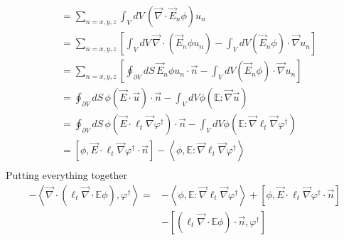 \documentclass[12pt]{report}
\newcommand{\bra}{\left\langle}
\newcommand{\ket}{\right\rangle}
\newcommand{\sbra}{\left[}
\newcommand{\sket}{\right]}
\renewcommand{\div}{\vec{\nabla} \cdot}
\newcommand{\grad}{\vec{\nabla}}
\newcommand{\vefadj}{\varphi^\dag}
\newcommand{\bound}{\partial V}
\newcommand{\vn}{\vec{n}}
\newcommand{\Edd}{\mathbb{E}}
\newcommand{\isigt}{\ell_t}
\begin{document}
\begin{appendices}
\begin{equation}
\begin{split}
& = \sum_{n=x,y,z} \int_V dV \, \left( \div \vec{E}_n \phi \right) u_{n} \\
& = \sum_{n=x,y,z} \left[ \int_V dV \,  \div \left( \vec{E}_n \phi u_n \right) - \int_V dV (\vec{E}_n \phi) \cdot \grad u_n  \right] \\
& = \sum_{n=x,y,z} \left[ \oint_{\bound} dS \,  \vec{E}_n \phi u_n \cdot \vn - \int_V dV (\vec{E}_n \phi) \cdot \grad u_n  \right] \\
& = \oint_{\bound} dS \,  \phi \left( \vec{E} \cdot \vec{u} \right) \cdot \vn - \int_V dV \phi \left( \Edd : \grad \vec{u} \right) \\
& = \oint_{\bound} dS \,  \phi \left( \vec{E} \cdot \isigt \grad \varphi^\dag \right) \cdot \vn - \int_V dV \phi \left( \Edd : \grad \isigt \grad \varphi^\dag \right) \\
& = \sbra \phi , \vec{E} \cdot \isigt \grad \varphi^\dag \cdot \vn \sket - \bra \phi , \Edd : \grad \isigt \grad \varphi^\dag \ket \\
\end{split}
\end{equation}
Putting everything together
\begin{equation}
\begin{split}
- \bra \div \left( \isigt \div \Edd \phi \right), \vefadj \ket
=& - \bra \phi , \Edd : \grad \isigt \grad \varphi^\dag \ket  
+ \sbra \phi , \vec{E} \cdot \isigt \grad \varphi^\dag \cdot \vn \sket  \\
&- \sbra \left(  \isigt \div \Edd \phi \right)  \cdot \vn , \varphi^\dag \sket\\
\end{split}
\end{equation}


\end{appendices}
\end{document}
